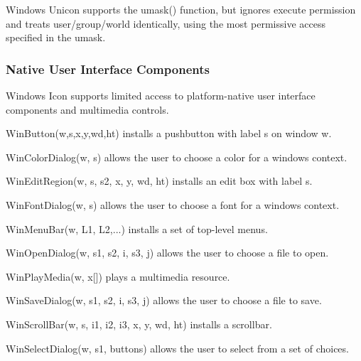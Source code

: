 Windows Unicon supports the umask() function, but ignores execute
permission and treats user/group/world identically, using the most
permissive access specified in the umask.

\subsubsection{Native User Interface Components}
Windows Icon supports limited access to platform-native user interface
components and multimedia controls.

WinButton(w,s,x,y,wd,ht) installs a pushbutton with label s on window w.

WinColorDialog(w, s) allows the user to choose a color for a
window{\textquotesingle}s context.

WinEditRegion(w, s, s2, x, y, wd, ht) installs an edit box with label s.

WinFontDialog(w, s) allows the user to choose a font for a
window{\textquotesingle}s context.

WinMenuBar(w, L1, L2,...) installs a set of top-level menus.

WinOpenDialog(w, s1, s2, i, s3, j) allows the user to choose a file to
open.

WinPlayMedia(w, x[]) plays a multimedia resource.

WinSaveDialog(w, s1, s2, i, s3, j) allows the user to choose a file to
save.

WinScrollBar(w, s, i1, i2, i3, x, y, wd, ht) installs a scrollbar.

WinSelectDialog(w, s1, buttons) allows the user to select from a set of
choices.

